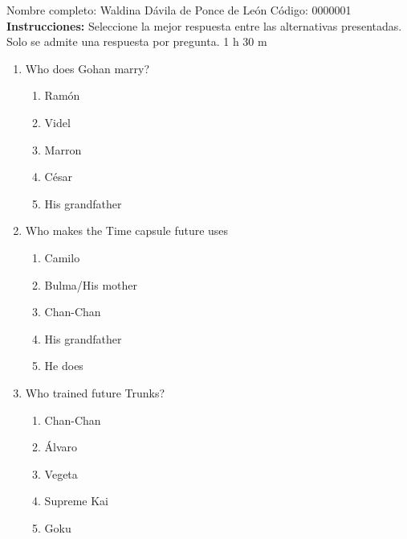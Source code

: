 \documentclass[letterpaper,addpoints,answers,twocolumn,10pt]{exam}
\begin{document}
\noindent Nombre completo: Waldina Dávila de Ponce de León
\newline \newline \newline \newline
Código: 0000001\newline \newline 
{\bf Instrucciones:} Seleccione la mejor respuesta entre las alternativas presentadas. Solo se admite una respuesta por pregunta.
 1 h 30 m

\begin{enumerate}[leftmargin=.2in]




\item  Who does Gohan marry?


\begin{enumerate}[noitemsep,leftmargin=0in]


\item  Ramón
\item  Videl
\item  Marron
\item  César
\item  His grandfather


\end{enumerate}



\item  Who makes the Time capsule future uses


\begin{enumerate}[noitemsep,leftmargin=0in]


\item  Camilo
\item  Bulma/His mother
\item  Chan-Chan
\item  His grandfather
\item  He does


\end{enumerate}



\item  Who trained future Trunks?


\begin{enumerate}[noitemsep,leftmargin=0in]


\item  Chan-Chan
\item  Álvaro
\item  Vegeta
\item  Supreme Kai
\item  Goku



\end{enumerate}
\end{enumerate}
\end{document}
